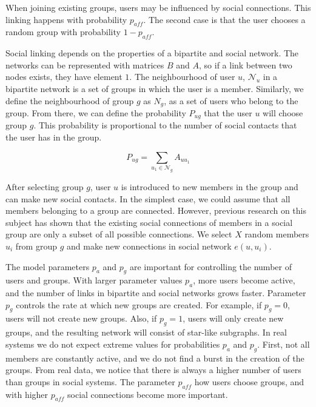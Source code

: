 When joining existing groups, users may be influenced by social connections. This linking happens with probability $p_{aff}$. The second case is that the user chooses a random group with probability $1-p_{aff}$. 

Social linking depends on the properties of a bipartite and social network. The networks can be represented with matrices $B$ and $A$, so if a link between two nodes exists, they have element $1$. The neighbourhood of user $u$, $\mathcal{N}_{u}$ in a bipartite network is a set of groups in which the user is a member. Similarly, we define the neighbourhood of group $g$ as $N_g$, as a set of users who belong to the group. From there, we can define the probability $ P_{ug}$ that the user $u$ will choose group $g$. This probability is proportional to the number of social contacts that the user has in the group. 

\begin{equation}
P_{ug}=\sum_{u_{1}\in \mathcal{N}_{g}} A_{uu_{1}} 
\label{eq1}
\end{equation}

After selecting group $g$, user $u$ is introduced to new members in the group and can make new social contacts. In the simplest case, we could assume that all members belonging to a group are connected. However, previous research on this subject \cite{ smiljanic2017associative, backstrom2006group, zheleva2009co} has shown that the existing social connections of members in a social group are only a subset of all possible connections. We select $X$ random members $u_i$ from group $g$ and make new connections in social network $e(u, u_i)$. 

The model parameters $p_a$ and $p_g$ are important for controlling the number of users and groups. With larger parameter values $p_a$, more users become active, and the number of links in bipartite and social networks grows faster. Parameter $p_g$ controls the rate at which new groups are created. For example, if $p_g=0$, users will not create new groups. Also, if $p_g=1$, users will only create new groups, and the resulting network will consist of star-like subgraphs. In real systems we do not expect extreme values for probabilities $p_a$ and $p_g$. First, not all members are constantly active, and we do not find a burst in the creation of the groups. From real data, we notice that there is always a higher number of users than groups in social systems. The parameter $p_{aff}$ how users choose groups, and with higher $p_{aff}$ social connections become more important. 

